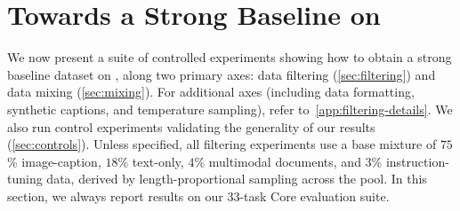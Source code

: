 \section{Towards a Strong Baseline on \dcvlm}\label{sec:experiments}






We now present a suite of controlled experiments showing how to obtain a strong baseline dataset on \dcvlm{}, along two primary axes: 
data filtering (\cref{sec:filtering}) and data mixing (\cref{sec:mixing}). 
For additional axes (including data formatting, synthetic captions, and temperature sampling), refer to~\cref{app:filtering-details}.
We also run control experiments validating the generality of our results (\cref{sec:controls}). 
Unless specified, all filtering experiments use a base mixture of $75$\% image-caption, $18$\% text-only, $4$\% multimodal documents, and $3$\% instruction-tuning data, derived by length-proportional sampling across the pool. 
In this section, we always report results on our 33-task Core evaluation suite.


 
 
